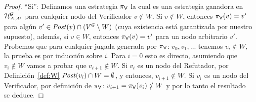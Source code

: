 \begin{proof}
``Si'':  Definamos una estrategia $\pi_{\mathsf{V}}$ la cual es una estrategia ganadora en $\mathcal{H}^{\mathcal{G}}_{A,A'}$ para cualquier nodo del Verificador $v \notin W$. 
Si $v \notin W$, entonces $\pi_{\mathsf{V}}(v) = v'$ para algún $v' \in \mathit{Post}(v) \cap (V^{\mathcal{G}} \setminus W)$ (cuya existencia está garantizada por nuestro supuesto), 
además, si $v \in W$, entonces $\pi_{\mathsf{V}}(v) = v'$ para un nodo arbitrario $v'$. 
Probemos que para cualquier jugada generada por $\pi_{\mathsf{V}}$: $v_0, v_1, \dots$ tenemos $v_i \notin W$, la prueba es por inducción sobre $i$.
Para $i=0$ esto es directo, asumiendo que $v_i \notin W$ vamos a probar que $v_{i+1} \notin W$. 
Si $v_i$ es un nodo del Refutador, por Definición~\ref{def:W}  
$\mathit{Post}(v_i) \cap W = \emptyset$, y entonces, $v_{i+1} \notin W$. 
Si $v_i$ es un nodo del Verificador, por definición de $\pi_{\mathsf{V}}$: $v_{i+1} = \pi_{\mathsf{V}}(v_i) \notin W$ y por lo tanto el resultado se deduce.  
\end{proof} \\

















